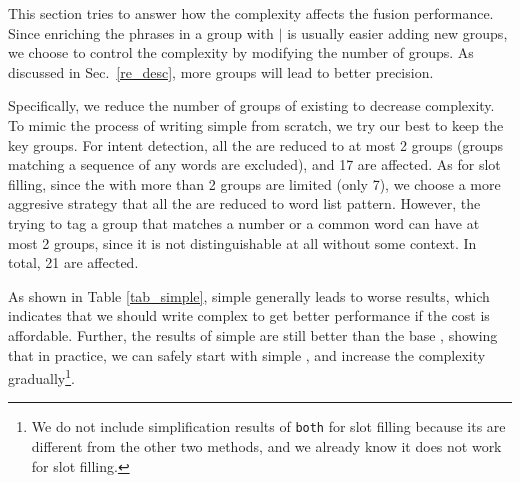 This section tries to answer how the \RE complexity affects the fusion performance.
Since enriching the phrases in a \RE group with $|$ is usually easier adding new groups,
we choose to control the \RE complexity by modifying the number of groups.
As discussed in Sec.~\ref{re_desc}, more \RE groups will lead to better precision.

Specifically, we reduce the number of groups of existing \REs to decrease \RE complexity.
To mimic the process of writing simple \REs from scratch, we try our best to keep the key \RE groups.
For intent detection, all the \REs are reduced to at most 2 groups (groups matching a sequence of any words are excluded), and 17 \REs are affected.
As for slot filling, since the \REs with more than 2 groups are limited (only 7), we choose a more aggresive strategy that all the \REs are reduced to word list pattern.
However, the \REs trying to tag a \RE group that matches a number or a common word can have at most 2 groups, since it is not distinguishable at all without some context.
In total, 21 \REs are affected.

As shown in Table \ref{tab_simple}, simple \RE generally leads to worse results, which indicates that we should write complex \RE to get better performance if the cost is affordable.
Further, the results of simple \RE are still better than the base \BLSTM, showing that in practice, we can safely start with simple \REs, and increase the complexity gradually\footnote{
We do not include simplification results of \texttt{both} for slot filling because its \REs are different from the other two methods, and we already know it does not work for slot filling.}.

